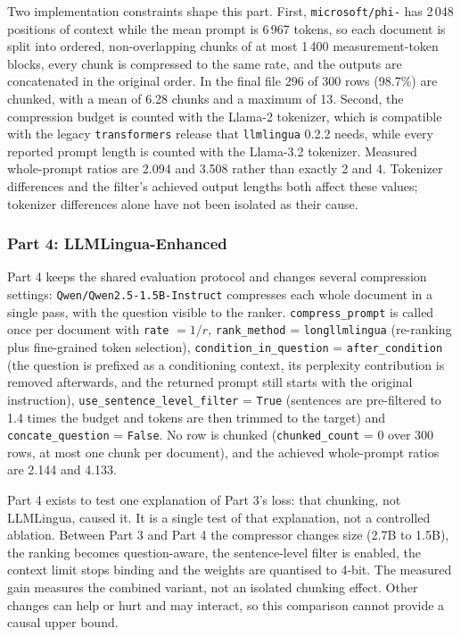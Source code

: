 ﻿\documentclass[10pt,a4paper,twocolumn]{article}
\newcommand{\PhiTwo}{\texttt{microsoft/\allowbreak phi-\allowbreak 2}}
\newcommand{\QwenOne}{\texttt{Qwen/}\allowbreak\texttt{Qwen2.5-\allowbreak 1.5B-\allowbreak Instruct}}
\begin{document}
Two implementation constraints shape this part. First, \PhiTwo{} has 2\,048
positions of context while the mean prompt is 6\,967 tokens, so each document is
split into ordered, non-overlapping chunks of at most 1\,400 measurement-token
blocks, every chunk is compressed to the same rate, and the outputs are
concatenated in the original order. In the final file 296 of 300 rows (98.7\%)
are chunked, with a mean of 6.28 chunks and a maximum of 13. Second, the
compression budget is counted with the Llama-2 tokenizer, which is compatible
with the legacy \texttt{transformers} release that \texttt{llmlingua} 0.2.2
needs, while every reported prompt length is counted with the Llama-3.2
tokenizer. Measured whole-prompt ratios are 2.094 and 3.508 rather than exactly 2 and 4. Tokenizer differences and the filter's achieved output lengths both affect these values; tokenizer differences alone have not been isolated as their cause.

\subsubsection{Part 4: LLMLingua-Enhanced}
\label{sec:p4}

Part 4 keeps the shared evaluation protocol and changes several compression settings:
\QwenOne{} compresses each whole document in a single
pass, with the question visible to the ranker. \texttt{compress\_prompt} is called
once per document with \texttt{rate} $= 1/r$, \texttt{rank\_method} =
\texttt{longllmlingua} (re-ranking plus fine-grained token selection),
\texttt{condition\_in\_question} = \texttt{after\_condition} (the question is
prefixed as a conditioning context, its perplexity contribution is removed
afterwards, and the returned prompt still starts with the original instruction),
\texttt{use\_sentence\_level\_filter} = \texttt{True} (sentences are pre-filtered
to 1.4 times the budget and tokens are then trimmed to the target) and
\texttt{concate\_question} = \texttt{False}. No row is chunked
(\texttt{chunked\_count} = 0 over 300 rows, at most one chunk per document), and
the achieved whole-prompt ratios are 2.144 and 4.133.

Part 4 exists to test one explanation of Part 3's loss: that chunking, not
LLMLingua, caused it. It is a single test of that explanation, not a controlled
ablation. Between Part 3 and Part 4 the compressor changes size (2.7B to 1.5B),
the ranking becomes question-aware, the sentence-level filter is enabled, the
context limit stops binding and the weights are quantised to 4-bit. The measured
gain measures the combined variant, not an isolated chunking effect. Other changes can help or hurt and may interact, so this comparison cannot provide a causal upper bound.
\end{document}
